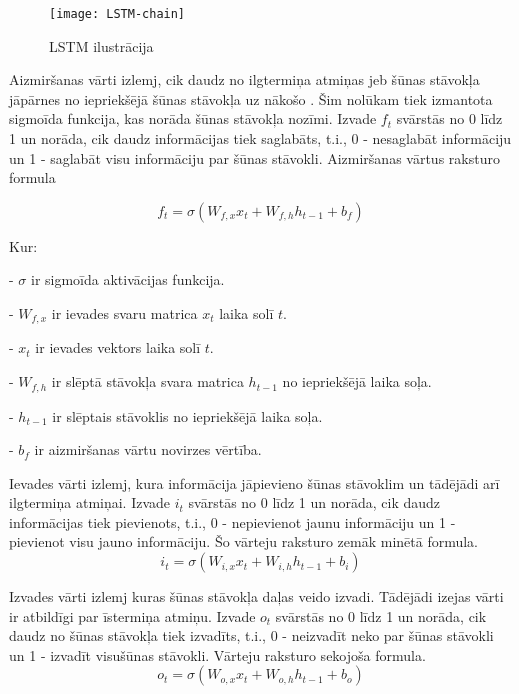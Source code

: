 \begin{figure}[H]
\texttt{[image: LSTM-chain]}
\caption{LSTM ilustrācija \cite{ChristopherOlahLSTM}}
\label{fig:LSTM-chain}
\end{figure}

Aizmiršanas vārti izlemj, cik daudz no ilgtermiņa atmiņas jeb šūnas stāvokļa jāpārnes no iepriekšējā šūnas stāvokļa uz nākošo . Šim nolūkam tiek izmantota sigmoīda funkcija, kas norāda šūnas stāvokļa nozīmi. Izvade \(f_t\) svārstās no 0 līdz 1 un norāda, cik daudz informācijas tiek saglabāts, t.i., 0 - nesaglabāt informāciju un 1 - saglabāt visu informāciju par šūnas stāvokli. Aizmiršanas vārtus raksturo formula

\begin{equation}
f_t = \sigma \left( W_{f, x} x_t + W_{f, h} h_{t-1} + b_f \right)
\end{equation}

Kur:

- \( \sigma \) ir sigmoīda aktivācijas funkcija.

- \( W_{f, x} \) ir ievades svaru matrica  \( x_t \) laika solī \( t \).

- \( x_t \) ir ievades vektors laika solī  \( t \).

- \( W_{f, h} \)  ir slēptā stāvokļa svara matrica \( h_{t-1} \) no iepriekšējā laika soļa.

- \( h_{t-1} \) ir slēptais stāvoklis no iepriekšējā laika soļa.

- \( b_f \) ir aizmiršanas vārtu novirzes vērtība.

Ievades vārti izlemj, kura informācija jāpievieno šūnas stāvoklim un tādējādi arī ilgtermiņa atmiņai. Izvade \(i_t\) svārstās no 0 līdz 1 un norāda, cik daudz informācijas tiek pievienots, t.i., 0 - nepievienot jaunu informāciju un 1 - pievienot visu jauno informāciju. Šo vārteju raksturo zemāk minētā formula.
\begin{equation}
i_t = \sigma \left( W_{i, x} x_t + W_{i, h} h_{t-1} + b_i \right)
\end{equation}

\pagebreak
Izvades vārti izlemj kuras šūnas stāvokļa daļas veido izvadi. Tādējādi izejas vārti ir atbildīgi par īstermiņa atmiņu. Izvade \(o_t\)  svārstās no 0 līdz 1 un norāda, cik daudz no šūnas stāvokļa tiek izvadīts, t.i., 0 - neizvadīt neko par šūnas stāvokli un 1 - izvadīt visušūnas stāvokli. Vārteju raksturo sekojoša formula.
\begin{equation}
o_t = \sigma \left( W_{o,x} x_t + W_{o,h} h_{t-1} + b_o \right)
\end{equation}

